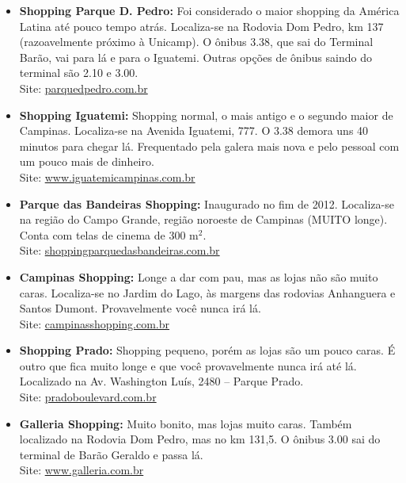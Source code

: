 \begin{itemize}
    \item   \textbf{Shopping Parque D. Pedro:} Foi considerado o maior shopping
        da América Latina até pouco tempo atrás. Localiza-se na Rodovia Dom
        Pedro, km 137 (razoavelmente próximo à Unicamp). O ônibus 3.38, que sai
        do Terminal Barão, vai para lá e para o Iguatemi. Outras opções de
        ônibus saindo do terminal são 2.10 e 3.00.
        \\Site: \url{parquedpedro.com.br}

    \item   \textbf{Shopping Iguatemi:} Shopping normal, o mais antigo e o
        segundo maior de Campinas. Localiza-se na Avenida Iguatemi, 777. O 3.38
        demora uns 40 minutos para chegar lá. Frequentado pela galera mais nova
        e pelo pessoal com um pouco mais de dinheiro.
        \\Site: \url{www.iguatemicampinas.com.br}

    \item   \textbf{Parque das Bandeiras Shopping:} Inaugurado no fim de 2012.
        Localiza-se na região do Campo Grande, região noroeste de Campinas 
        (MUITO longe). Conta com telas de cinema de 300 m$^{2}$.
        \\Site: \url{shoppingparquedasbandeiras.com.br}

    \item   \textbf{Campinas Shopping:} Longe a dar com pau, mas as lojas não
        são muito caras. Localiza-se no Jardim do Lago, às margens das rodovias 
        Anhanguera e Santos Dumont. Provavelmente você nunca irá lá.
        \\Site: \url{campinasshopping.com.br}

    \item   \textbf{Shopping Prado:} Shopping pequeno, porém as lojas são um 
        pouco caras. É outro que fica muito longe e que você provavelmente nunca 
        irá até lá. Localizado na Av. Washington Luís, 2480 -- Parque Prado.
        \\Site: \url{pradoboulevard.com.br}

    \item   \textbf{Galleria Shopping:} Muito bonito, mas lojas muito caras.
        Também localizado na Rodovia Dom Pedro, mas no km 131,5. O ônibus 3.00
        sai do terminal de Barão Geraldo e passa lá.
        \\Site: \url{www.galleria.com.br}


\end{itemize}
